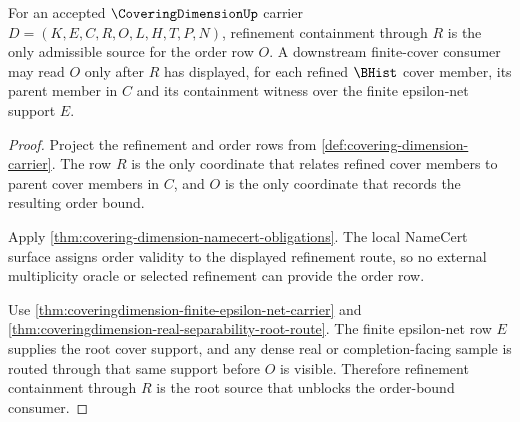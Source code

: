 \begin{theorem}
\label{thm:coveringdimension-refinement-order-root-unblock}
For an accepted $\CoveringDimensionUp$ carrier $D=(K,E,C,R,O,L,H,T,P,N)$, refinement containment through $R$ is the only admissible source for the order row $O$. A downstream finite-cover consumer may read $O$ only after $R$ has displayed, for each refined $\BHist$ cover member, its parent member in $C$ and its containment witness over the finite epsilon-net support $E$.
\end{theorem}
\begin{proof}
Project the refinement and order rows from \autoref{def:covering-dimension-carrier}. The row $R$ is the only coordinate that relates refined cover members to parent cover members in $C$, and $O$ is the only coordinate that records the resulting order bound.

Apply \autoref{thm:covering-dimension-namecert-obligations}. The local NameCert surface assigns order validity to the displayed refinement route, so no external multiplicity oracle or selected refinement can provide the order row.

Use \autoref{thm:coveringdimension-finite-epsilon-net-carrier} and \autoref{thm:coveringdimension-real-separability-root-route}. The finite epsilon-net row $E$ supplies the root cover support, and any dense real or completion-facing sample is routed through that same support before $O$ is visible. Therefore refinement containment through $R$ is the root source that unblocks the order-bound consumer.
\end{proof}

